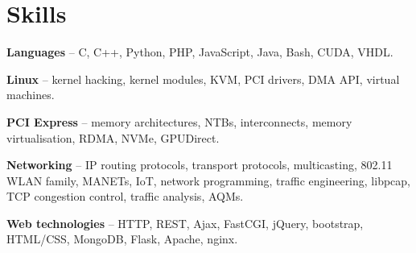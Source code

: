 \section{Skills}
\begin{small}
	\parbox[t][][t]{\linewidth}{
		\textbf{Languages} -- C, C++, Python, PHP, JavaScript, Java, Bash, CUDA, VHDL.
		\smallbreak
	}
	\parbox[t][][t]{\linewidth}{
		\textbf{Linux} -- kernel hacking, kernel modules,
		KVM, PCI drivers, DMA API, virtual machines.
		\smallbreak
	}
	\parbox[t][][t]{\linewidth}{
		\textbf{PCI Express} -- memory architectures, NTBs, 
		interconnects, memory virtualisation, RDMA, NVMe, GPUDirect.
		\smallbreak
	}
	\parbox[t][][t]{\linewidth}{
		\textbf{Networking} -- IP routing protocols, transport protocols,
		multicasting, 802.11 WLAN family, MANETs, IoT, network programming, 
		traffic engineering, libpcap, TCP congestion control, traffic
		analysis, AQMs.
		\smallbreak
	}
	\parbox[t][][t]{\linewidth}{
		\textbf{Web technologies} -- HTTP, REST, Ajax, FastCGI, jQuery,
		bootstrap, HTML/CSS, MongoDB, Flask, Apache, nginx.
		\smallbreak
	}
\end{small}


